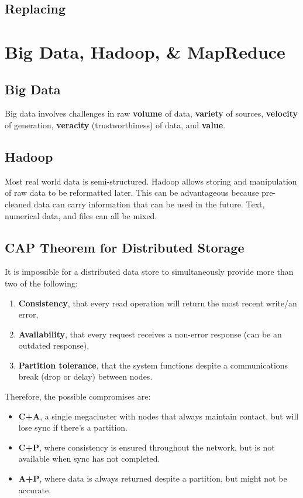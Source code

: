 \documentclass[9pt,twocolumn]{article}
\begin{document}
\subsection*{Replacing}




\section{Big Data, Hadoop, \& MapReduce}
\subsection*{Big Data}
Big data involves challenges in raw \textbf{volume} of data, \textbf{variety} of sources, \textbf{velocity} of generation, \textbf{veracity} (trustworthiness) of data, and \textbf{value}.

\subsection*{Hadoop}
Most real world data is semi-structured. Hadoop allows storing and manipulation of raw data to be reformatted later. This can be advantageous because pre-cleaned data can carry information that can be used in the future. Text, numerical data, and files can all be mixed.

\subsection*{CAP Theorem for Distributed Storage}
It is impossible for a distributed data store to simultaneously provide more than two of the following:
\begin{enumerate}
	\item \textbf{Consistency}, that every read operation will return the most recent write/an error,
	\item \textbf{Availability}, that every request receives a non-error response (can be an outdated response),
	\item \textbf{Partition tolerance}, that the system functions despite a communications break (drop or delay) between nodes.
\end{enumerate}
Therefore, the possible compromises are:
\begin{itemize}
	\item \textbf{C+A}, a single megacluster with nodes that always maintain contact, but will lose sync if there's a partition.
	\item \textbf{C+P}, where consistency is ensured throughout the network, but is not available when sync has not completed.
	\item \textbf{A+P}, where data is always returned despite a partition, but might not be accurate.
\end{itemize}
\end{document}
